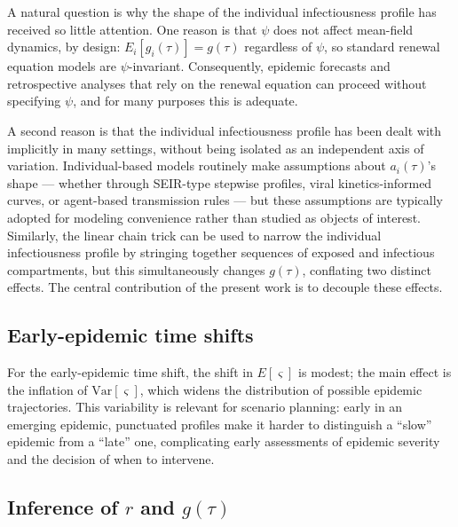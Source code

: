 \documentclass[10pt]{article}
\begin{document}
A natural question is why the shape of the individual infectiousness profile has received so little attention. One reason is that $\psi$ does not affect mean-field dynamics, by design: $E_i[g_i(\tau)] = g(\tau)$ regardless of $\psi$, so standard renewal equation models are $\psi$-invariant. Consequently, epidemic forecasts and retrospective analyses that rely on the renewal equation can proceed without specifying $\psi$, and for many purposes this is adequate.

A second reason is that the individual infectiousness profile has been dealt with implicitly in many settings, without being isolated as an independent axis of variation. Individual-based models routinely make assumptions about $a_i(\tau)$'s shape --- whether through SEIR-type stepwise profiles, viral kinetics-informed curves, or agent-based transmission rules --- but these assumptions are typically adopted for modeling convenience rather than studied as objects of interest. Similarly, the linear chain trick can be used to narrow the individual infectiousness profile by stringing together sequences of exposed and infectious compartments, but this simultaneously changes $g(\tau)$, conflating two distinct effects\citep{wearing_appropriate_2005, lloyd_realistic_2001}. The central contribution of the present work is to decouple these effects.

\subsection{Early-epidemic time shifts}

For the early-epidemic time shift, the shift in $E[\varsigma]$ is modest; the main effect is the inflation of $\text{Var}[\varsigma]$, which widens the distribution of possible epidemic trajectories. This variability is relevant for scenario planning: early in an emerging epidemic, punctuated profiles make it harder to distinguish a ``slow'' epidemic from a ``late'' one, complicating early assessments of epidemic severity and the decision of when to intervene.

\subsection{Inference of $r$ and $g(\tau)$}
\end{document}
